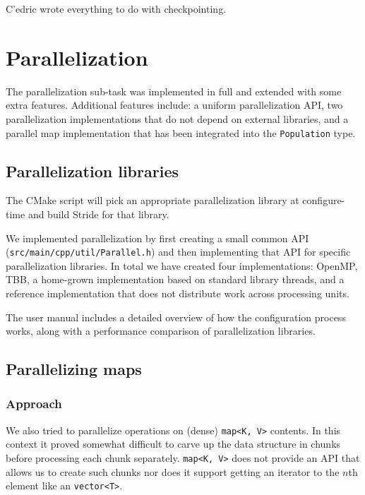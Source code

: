 \documentclass[a4paper,12pt]{article}
\newcommand{\sourcefile}[1]{\texttt{src/main/cpp/#1}}
\newcommand{\typename}[2]{\texttt{#2}} %
\begin{document}
C'{e}dric wrote everything to do with checkpointing.

\section{Parallelization}

The parallelization sub-task was implemented in full and extended with some extra features. Additional features include: a uniform parallelization API, two parallelization implementations that do not depend on external libraries, and a parallel map implementation that has been integrated into the \typename{stride}{Population} type.

\subsection{Parallelization libraries}

The CMake script will pick an appropriate parallelization library at configure-time and build Stride for that library.

We implemented parallelization by first creating a small common API (\sourcefile{util/Parallel.h}) and then implementing that API for specific parallelization libraries. In total we have created four implementations: OpenMP, TBB, a home-grown implementation based on standard library threads, and a reference implementation that does not distribute work across processing units.

The user manual includes a detailed overview of how the configuration process works, along with a performance comparison of parallelization libraries.

\subsection{Parallelizing maps}

\subsubsection{Approach}

We also tried to parallelize operations on (dense) \typename{std}{map<K, V>} contents. In this context it proved somewhat difficult to carve up the data structure in chunks before processing each chunk separately. \typename{std}{map<K, V>} does not provide an API that allows us to create such chunks nor does it support getting an iterator to the $n$th element like an \typename{std}{vector<T>}.
\end{document}
